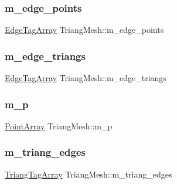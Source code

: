 \subsubsection{\texorpdfstring{m\+\_\+edge\+\_\+points}{m\_edge\_points}}
{\footnotesize\ttfamily \hyperlink{TriangMesh_8h_abc2bd59f66a99a49734f137afeb7811c}{Edge\+Tag\+Array} Triang\+Mesh\+::m\+\_\+edge\+\_\+points\hspace{0.3cm}{\ttfamily [protected]}}

\mbox{\label{structTriangMesh_a55e3d80b81a3744d622e4b5560717f0a}} 
\subsubsection{\texorpdfstring{m\+\_\+edge\+\_\+triangs}{m\_edge\_triangs}}
{\footnotesize\ttfamily \hyperlink{TriangMesh_8h_abc2bd59f66a99a49734f137afeb7811c}{Edge\+Tag\+Array} Triang\+Mesh\+::m\+\_\+edge\+\_\+triangs\hspace{0.3cm}{\ttfamily [protected]}}

\mbox{\label{structTriangMesh_a2079ca25815c1e3234c7a89c28a2cf87}} 
\subsubsection{\texorpdfstring{m\+\_\+p}{m\_p}}
{\footnotesize\ttfamily \hyperlink{PointOperations_8h_aa878fb8322bc087b43ba840347e3469a}{Point\+Array} Triang\+Mesh\+::m\+\_\+p\hspace{0.3cm}{\ttfamily [protected]}}

\mbox{\label{structTriangMesh_a62df1a2e039c2ff911a14f856b57e733}} 
\subsubsection{\texorpdfstring{m\+\_\+triang\+\_\+edges}{m\_triang\_edges}}
{\footnotesize\ttfamily \hyperlink{TriangMesh_8h_a327fc0ebbe645527e422ebcea99b4cd3}{Triang\+Tag\+Array} Triang\+Mesh\+::m\+\_\+triang\+\_\+edges\hspace{0.3cm}{\ttfamily [protected]}}

